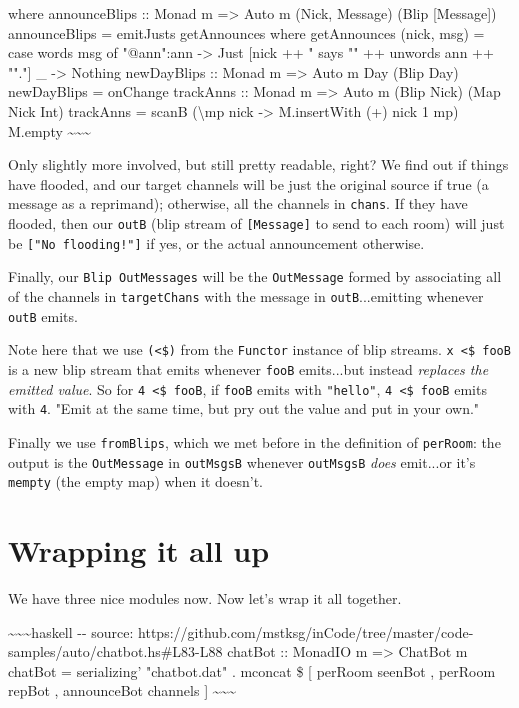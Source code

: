 \documentclass[]{article}
\begin{document}
where announceBlips :: Monad m =\textgreater{} Auto m (Nick, Message) (Blip
{[}Message{]}) announceBlips = emitJusts getAnnounces where getAnnounces (nick,
msg) = case words msg of "@ann":ann -\textgreater{} Just {[}nick ++ " says "" ++
unwords ann ++ ""."{]} \_ -\textgreater{} Nothing newDayBlips :: Monad m
=\textgreater{} Auto m Day (Blip Day) newDayBlips = onChange trackAnns :: Monad
m =\textgreater{} Auto m (Blip Nick) (Map Nick Int) trackAnns = scanB
(\textbackslash{}mp nick -\textgreater{} M.insertWith (+) nick 1 mp) M.empty
\textasciitilde{}\textasciitilde{}\textasciitilde{}

Only slightly more involved, but still pretty readable, right? We find out if
things have flooded, and our target channels will be just the original source if
true (a message as a reprimand); otherwise, all the channels in \texttt{chans}.
If they have flooded, then our \texttt{outB} (blip stream of
\texttt{{[}Message{]}} to send to each room) will just be
\texttt{{[}"No\ flooding!"{]}} if yes, or the actual announcement otherwise.

Finally, our \texttt{Blip\ OutMessages} will be the \texttt{OutMessage} formed
by associating all of the channels in \texttt{targetChans} with the message in
\texttt{outB}...emitting whenever \texttt{outB} emits.

Note here that we use \texttt{(\textless{}\$)} from the \texttt{Functor}
instance of blip streams. \texttt{x\ \textless{}\$\ fooB} is a new blip stream
that emits whenever \texttt{fooB} emits...but instead \emph{replaces the emitted
value}. So for \texttt{4\ \textless{}\$\ fooB}, if \texttt{fooB} emits with
\texttt{"hello"}, \texttt{4\ \textless{}\$\ fooB} emits with \texttt{4}. "Emit
at the same time, but pry out the value and put in your own."

Finally we use \texttt{fromBlips}, which we met before in the definition of
\texttt{perRoom}: the output is the \texttt{OutMessage} in \texttt{outMsgsB}
whenever \texttt{outMsgsB} \emph{does} emit...or it's \texttt{mempty} (the empty
map) when it doesn't.

\section{Wrapping it all up}

We have three nice modules now. Now let's wrap it all together.

\textasciitilde{}\textasciitilde{}\textasciitilde{}haskell -\/- source:
https://github.com/mstksg/inCode/tree/master/code-samples/auto/chatbot.hs\#L83-L88
chatBot :: MonadIO m =\textgreater{} ChatBot m chatBot = serializing'
"chatbot.dat" . mconcat \$ {[} perRoom seenBot , perRoom repBot , announceBot
channels {]} \textasciitilde{}\textasciitilde{}\textasciitilde{}
\end{document}
